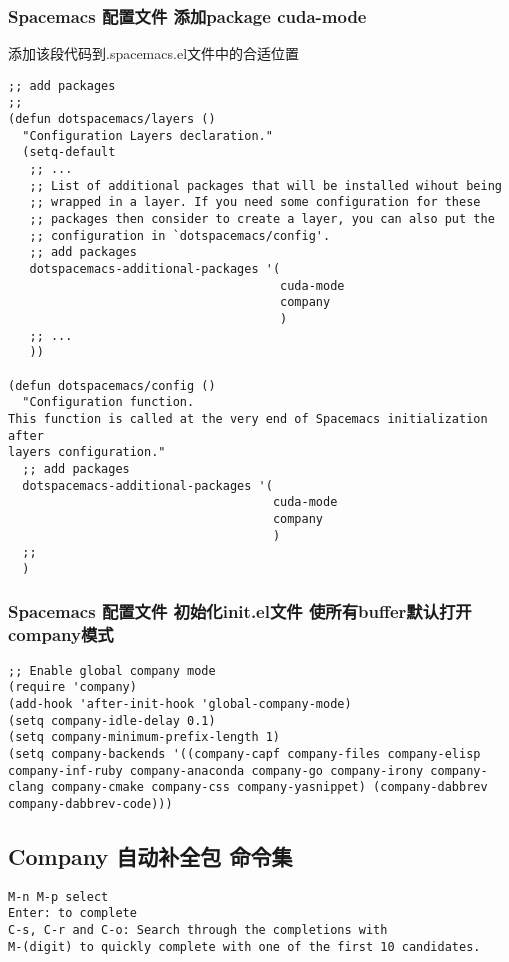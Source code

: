 \documentclass[11pt]{article}
\begin{document}
\subsubsection{Spacemacs 配置文件 添加package cuda-mode}
\label{sec:orgad9b340}
添加该段代码到.spacemacs.el文件中的合适位置
\begin{verbatim}
;; add packages 
;;
(defun dotspacemacs/layers ()
  "Configuration Layers declaration."
  (setq-default
   ;; ...
   ;; List of additional packages that will be installed wihout being
   ;; wrapped in a layer. If you need some configuration for these
   ;; packages then consider to create a layer, you can also put the
   ;; configuration in `dotspacemacs/config'.
   ;; add packages
   dotspacemacs-additional-packages '(
                                      cuda-mode
                                      company
                                      )
   ;; ...
   ))

(defun dotspacemacs/config ()
  "Configuration function.
This function is called at the very end of Spacemacs initialization after
layers configuration."
  ;; add packages
  dotspacemacs-additional-packages '(
                                     cuda-mode
                                     company
                                     )
  ;; 
  )
\end{verbatim}
\subsubsection{Spacemacs 配置文件 初始化init.el文件 使所有buffer默认打开company模式}
\label{sec:orgdff41c3}
\begin{verbatim}
;; Enable global company mode
(require 'company)
(add-hook 'after-init-hook 'global-company-mode)
(setq company-idle-delay 0.1)
(setq company-minimum-prefix-length 1)
(setq company-backends '((company-capf company-files company-elisp company-inf-ruby company-anaconda company-go company-irony company-clang company-cmake company-css company-yasnippet) (company-dabbrev company-dabbrev-code)))
\end{verbatim}
\subsection{Company 自动补全包 命令集}
\label{sec:orgc1c8e24}
\begin{verbatim}
M-n M-p select
Enter: to complete 
C-s, C-r and C-o: Search through the completions with 
M-(digit) to quickly complete with one of the first 10 candidates.
\end{verbatim}
\end{document}
